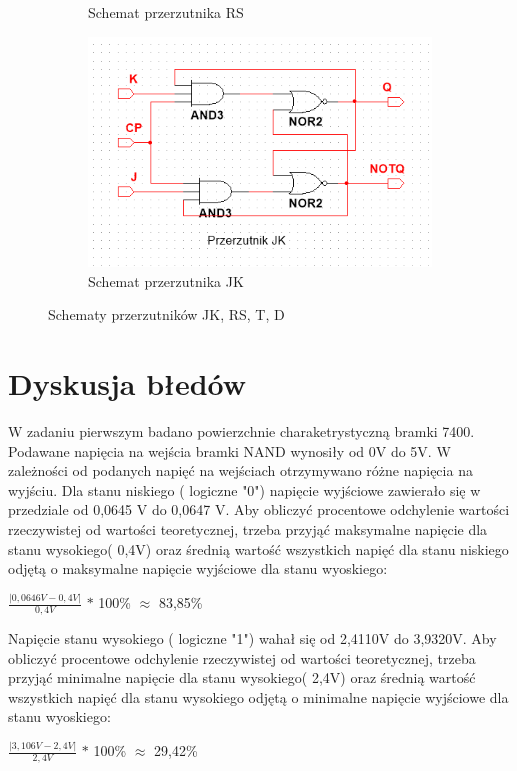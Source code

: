 \documentclass{article}
\begin{document}
\begin{figure}[h]
\begin{subfigure}[t]{0.3\textwidth}
        \caption{Schemat przerzutnika RS}
    \end{subfigure}
        \hfill
    \begin{subfigure}[t]{0.3\textwidth}
        \centering
        \includegraphics[width=\textwidth]{JK.png}
        \caption{Schemat przerzutnika JK}
    \end{subfigure}
    \caption{Schematy przerzutników JK, RS, T, D}
    \label{fig:bramki}
\end{figure}

\pagebreak
\section{Dyskusja błedów}

W zadaniu pierwszym badano powierzchnie charaketrystyczną bramki 7400. Podawane napięcia na wejścia bramki NAND wynosiły od 0V do 5V. W zależności od podanych napięć na wejściach otrzymywano różne napięcia na wyjściu. Dla stanu niskiego ( logiczne "0") napięcie wyjściowe zawierało się w przedziale od 0,0645 V do 0,0647 V. Aby obliczyć procentowe odchylenie wartości rzeczywistej od wartości teoretycznej, trzeba przyjąć maksymalne napięcie dla stanu wysokiego( 0,4V) oraz średnią wartość wszystkich napięć dla stanu niskiego odjętą o maksymalne napięcie wyjściowe dla stanu wyoskiego:
\begin{center}
	$\frac{|0,0646V-0,4V|}{0,4V}$ $\ast$ 100\% $\approx$ 83,85\%
\end{center}

Napięcie stanu wysokiego ( logiczne "1") wahał się od 2,4110V do 3,9320V. Aby obliczyć procentowe odchylenie rzeczywistej od wartości teoretycznej, trzeba przyjąć minimalne napięcie dla stanu wysokiego( 2,4V) oraz średnią wartość wszystkich napięć dla stanu wysokiego odjętą o minimalne napięcie wyjściowe dla stanu wyoskiego:
\begin{center}
	$\frac{|3,106V - 2,4V|}{2,4V}$ $\ast$ 100\% $\approx$ 29,42\%
\end{center}
\end{document}
